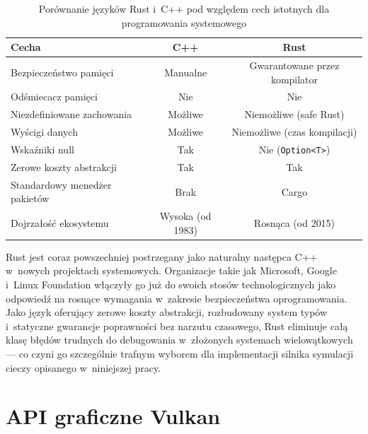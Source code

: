 \begin{table}[ht]
    \centering
    \caption{Porównanie języków Rust i~C++ pod względem cech istotnych dla programowania systemowego}
    \label{tab:rust_vs_cpp}
    \small
    \begin{tabular}{lcc}
    \toprule
    Cecha & C++ & Rust \\ \midrule
    Bezpieczeństwo pamięci      & Manualne              & Gwarantowane przez kompilator \\
    Odśmiecacz pamięci          & Nie                   & Nie                           \\
    Niezdefiniowane zachowania  & Możliwe               & Niemożliwe (safe Rust)        \\
    Wyścigi danych              & Możliwe               & Niemożliwe (czas kompilacji)  \\
    Wskaźniki null              & Tak                   & Nie (\texttt{Option<T>})      \\
    Zerowe koszty abstrakcji    & Tak                   & Tak                           \\
    Standardowy menedżer pakietów & Brak                & Cargo                         \\
    Dojrzałość ekosystemu       & Wysoka (od 1983)      & Rosnąca (od 2015)             \\
    \bottomrule
    \end{tabular}
\end{table}

Rust jest coraz powszechniej postrzegany jako naturalny następca C++ w~nowych projektach systemowych. Organizacje takie jak Microsoft, Google i~Linux Foundation włączyły go już do swoich stosów technologicznych jako odpowiedź na rosnące wymagania w~zakresie bezpieczeństwa oprogramowania. Jako język oferujący zerowe koszty abstrakcji, rozbudowany system typów i~statyczne gwarancje poprawności bez narzutu czasowego, Rust eliminuje całą klasę błędów trudnych do debugowania w~złożonych systemach wielowątkowych --- co czyni go szczególnie trafnym wyborem dla implementacji silnika symulacji cieczy opisanego w~niniejszej pracy.


\section{API graficzne Vulkan}

